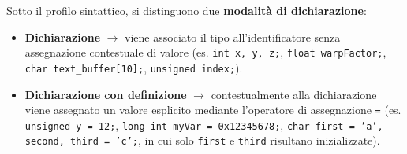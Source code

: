Sotto il profilo sintattico, si distinguono due \textbf{modalità di dichiarazione}:
\begin{itemize}
    \item \textbf{Dichiarazione} $\rightarrow$ viene associato il tipo all'identificatore senza assegnazione contestuale di valore (es. \texttt{int x, y, z;}, \texttt{float warpFactor;}, \texttt{char text\_buffer[10];}, \texttt{unsigned index;}).
    \item \textbf{Dichiarazione con definizione} $\rightarrow$ contestualmente alla dichiarazione viene assegnato un valore esplicito mediante l'operatore di assegnazione \texttt{=} (es. \texttt{unsigned y = 12;}, \texttt{long int myVar = 0x12345678;}, \texttt{char first = 'a', second, third = 'c';}, in cui solo \texttt{first} e \texttt{third} risultano inizializzate).
\end{itemize}

